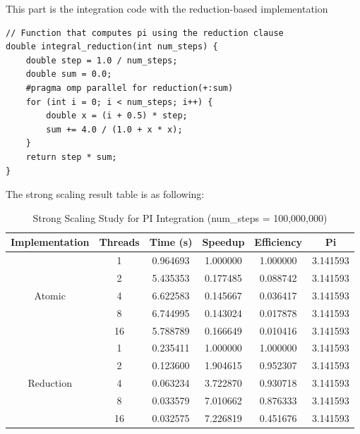 \documentclass[11pt]{article}
\begin{document}
This part is the integration code with the reduction-based implementation
\begin{lstlisting}[style=C++Style]
// Function that computes pi using the reduction clause
double integral_reduction(int num_steps) {
    double step = 1.0 / num_steps;
    double sum = 0.0;
    #pragma omp parallel for reduction(+:sum)
    for (int i = 0; i < num_steps; i++) {
        double x = (i + 0.5) * step;
        sum += 4.0 / (1.0 + x * x);
    }
    return step * sum;
}
\end{lstlisting}

The strong scaling result table is as following:

\begin{table}[H]
\centering
\begin{tabular}{|c|c|c|c|c|c|}
\hline
\textbf{Implementation} & \textbf{Threads} & \textbf{Time (s)} & \textbf{Speedup} & \textbf{Efficiency} & \textbf{Pi} \\ \hline
\multirow{5}{*}{Atomic}
& 1 & 0.964693 & 1.000000 & 1.000000 & 3.141593 \\ \cline{2-6}
& 2 & 5.435353 & 0.177485 & 0.088742 & 3.141593 \\ \cline{2-6}
& 4 & 6.622583 & 0.145667 & 0.036417 & 3.141593 \\ \cline{2-6}
& 8 & 6.744995 & 0.143024 & 0.017878 & 3.141593 \\ \cline{2-6}
& 16 & 5.788789 & 0.166649 & 0.010416 & 3.141593 \\ \hline
\multirow{5}{*}{Reduction}
& 1 & 0.235411 & 1.000000 & 1.000000 & 3.141593 \\ \cline{2-6}
& 2 & 0.123600 & 1.904615 & 0.952307 & 3.141593 \\ \cline{2-6}
& 4 & 0.063234 & 3.722870 & 0.930718 & 3.141593 \\ \cline{2-6}
& 8 & 0.033579 & 7.010662 & 0.876333 & 3.141593 \\ \cline{2-6}
& 16 & 0.032575 & 7.226819 & 0.451676 & 3.141593 \\ \hline
\end{tabular}
\caption{Strong Scaling Study for PI Integration (num\_steps = 100,000,000)}
\label{tab:pi_scaling}
\end{table}
\end{document}
